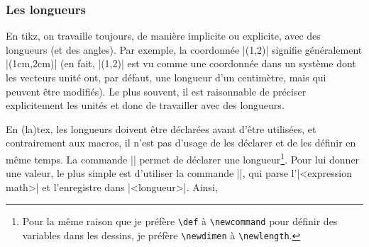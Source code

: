 \documentclass[a4paper]{ltxdoc}
\begin{document}
\begin{codeexample}[]
\end{codeexample}

\subsubsection{Les longueurs}

En tikz, on travaille toujours, de manière implicite ou explicite, avec des longueurs (et des angles). Par exemple, la coordonnée |(1,2)| signifie généralement |(1cm,2cm)| (en fait, |(1,2)| est vu comme une coordonnée dans un système dont les vecteurs unité ont, par défaut, une longueur d'un centimètre, mais qui peuvent être modifiés).
Le plus souvent, il est raisonnable de préciser explicitement les unités et donc de travailler avec des longueurs.

En (la)tex, les longueurs doivent être déclarées avant d'être utilisées, et contrairement aux macros, il n'est pas d'usage de les déclarer et de les définir en même temps. La commande || permet de déclarer une longueur\footnote{Pour la même raison que je préfère \texttt{\textbackslash{}def} à \texttt{\textbackslash{}newcommand} pour définir des variables dans les dessins, je préfère \texttt{\textbackslash{}newdimen} à \texttt{\textbackslash{}newlength}.}. Pour lui donner une valeur, le plus simple est d'utiliser la commande ||, qui parse l'|<expression math>| et l'enregistre dans |<longueur>|. Ainsi,

\begin{codeexample}[]
\end{codeexample}
\end{document}
